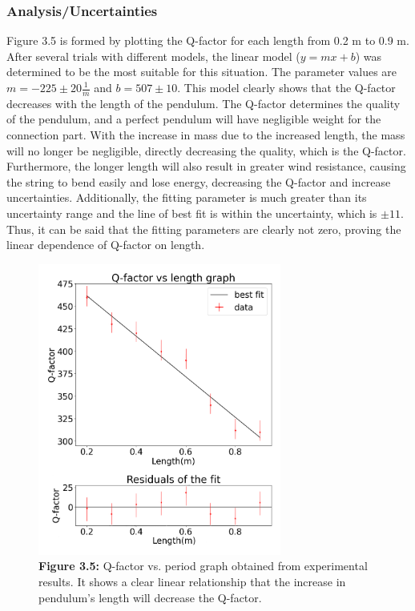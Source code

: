 \documentclass[11pt,titlepage,a4paper,twocolumn]{article}
\begin{document}
        \subsubsection{Analysis/Uncertainties}
            \hspace{\parindent}\hspace{\parindent}Figure 3.5 is formed by plotting the Q-factor for each length from 0.2 m to 0.9 m. After several trials with different models, the linear model ($y = mx + b$) was determined to be the most suitable for this situation. The parameter values are $m = -225 \pm 20\frac{1}{m}$ and $b = 507 \pm 10$. This model clearly shows that the Q-factor decreases with the length of the pendulum. The Q-factor determines the quality of the pendulum, and a perfect pendulum will have negligible weight for the connection part. With the increase in mass due to the increased length, the mass will no longer be negligible, directly decreasing the quality, which is the Q-factor. Furthermore, the longer length will also result in greater wind resistance, causing the string to bend easily and lose energy, decreasing the Q-factor and increase uncertainties. Additionally, the fitting parameter is much greater than its uncertainty range and the line of best fit is within the uncertainty, which is $\pm11$. Thus, it can be said that the fitting parameters are clearly not zero, proving the linear dependence of Q-factor on length.
            \begin{figure}[H]
                \centering
                \includegraphics[width=8cm]{3.4.png}
                \caption*{\textbf{Figure 3.5:} Q-factor vs. period graph obtained from experimental results. It shows a clear linear relationship that the increase in pendulum's length will decrease the Q-factor.}
            \end{figure}
    
\end{document}
